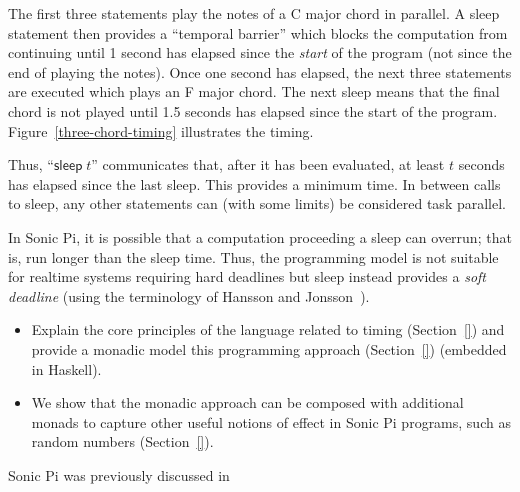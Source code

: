 \documentclass[preprint]{sigplanconf}
\newcommand{\note}[1]{{\color{blue}{#1}}}
\theoremstyle{definition}
\newcommand{\sleep}{\mathsf{sleep}\;}
\newcommand{\sleepOp}{\textsf{sleep}}
\newcommand{\lang}{Sonic Pi}
\begin{document}
The first three statements play the notes of a C major chord in
parallel.  A \sleepOp{} statement then provides a ``temporal barrier''
which blocks the computation from continuing until 1 second has
elapsed since the \emph{start} of the program (not since the end of
playing the notes). Once one second has elapsed, the next three
statements are executed which plays an F major chord. The next
\sleepOp{} means that the final chord is not played until 1.5 seconds
has elapsed since the start of the
program. Figure~\ref{three-chord-timing} illustrates the timing.

Thus, ``$\sleep{} t$'' communicates that, after it has been evaluated, at least
$t$ seconds has elapsed since the last \sleepOp{}. This provides a minimum
time. In between calls to \sleepOp{}, any other statements can (with some limits)
be considered task parallel.

In \lang{}, it is possible that a computation proceeding a \sleepOp{}
can overrun; that is, run longer than the sleep time.  Thus, the
programming model is not suitable for realtime systems requiring hard
deadlines but \sleepOp{} instead provides a \emph{soft deadline} (using
the terminology of Hansson and Jonsson~\cite{hansson1994logic}).

\note{Contributions}

\begin{itemize}
\item Explain the core principles of the language related to timing
(Section~\ref{}) and provide a monadic model this programming approach
(Section~\ref{}) (embedded in Haskell).

\item We show that the monadic approach can be composed with
  additional monads to capture other useful notions of effect in
  \lang{} programs, such as random numbers (Section~\ref{}).
\end{itemize}

%
\lang{} was previously discussed in~\cite{Aaron2013}
\end{document}
